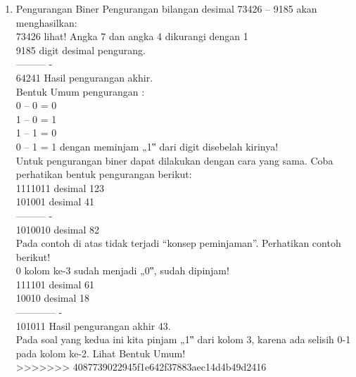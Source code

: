 \documentclass{article}
\begin{document}
\begin{enumerate}
\begin{enumerate}
\item Pengurangan Biner
Pengurangan bilangan desimal 73426 – 9185 akan menghasilkan: \\
73426 \textrightarrow lihat! Angka 7 dan angka 4 dikurangi dengan 1 \\
9185 \textrightarrow digit desimal pengurang. \\
--------- - \\
64241 \textrightarrow Hasil pengurangan akhir. \\
Bentuk Umum pengurangan : \\
0 – 0 = 0 \\
1 – 0 = 1 \\
1 – 1 = 0 \\
0 – 1 = 1 \textrightarrow dengan meminjam „1‟ dari digit disebelah kirinya! \\ 
Untuk pengurangan biner dapat dilakukan dengan cara yang sama. Coba perhatikan bentuk pengurangan berikut: \\
1111011 \textrightarrow desimal 123 \\
101001 \textrightarrow desimal 41 \\
--------- - \\
1010010 \textrightarrow desimal 82 \\
Pada contoh di atas tidak terjadi “konsep peminjaman”. Perhatikan contoh berikut! \\
0 \textrightarrow kolom ke-3 sudah menjadi „0‟, sudah dipinjam! \\
111101 \textrightarrow desimal 61 \\
10010 \textrightarrow desimal 18 \\
------------ - \\
101011 \textrightarrow Hasil pengurangan akhir 43. \\

Pada soal yang kedua ini kita pinjam „1‟ dari kolom 3, karena ada selisih 0-1 pada kolom ke-2. Lihat Bentuk Umum! \\
>>>>>>> 4087739022945f1e642f37883aec14d4b49d2416









\end{enumerate}



\end{enumerate}
\end{document}
